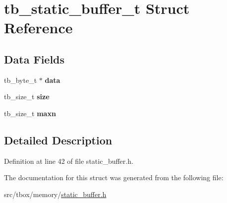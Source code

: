 \hypertarget{structtb__static__buffer__t}{\section{tb\-\_\-static\-\_\-buffer\-\_\-t Struct Reference}
\label{structtb__static__buffer__t}
}
\subsection*{Data Fields}
\begin{DoxyCompactItemize}
\item 
\hypertarget{structtb__static__buffer__t_a0491d754723b9ba346cbd25fd88e7c6f}{tb\-\_\-byte\-\_\-t $\ast$ {\bfseries data}}\label{structtb__static__buffer__t_a0491d754723b9ba346cbd25fd88e7c6f}

\item 
\hypertarget{structtb__static__buffer__t_afc6510d45901f179095ff1e505e4b572}{tb\-\_\-size\-\_\-t {\bfseries size}}\label{structtb__static__buffer__t_afc6510d45901f179095ff1e505e4b572}

\item 
\hypertarget{structtb__static__buffer__t_abe7d1faa52fd5d7d526fd423285da879}{tb\-\_\-size\-\_\-t {\bfseries maxn}}\label{structtb__static__buffer__t_abe7d1faa52fd5d7d526fd423285da879}

\end{DoxyCompactItemize}


\subsection{Detailed Description}


Definition at line 42 of file static\-\_\-buffer.\-h.



The documentation for this struct was generated from the following file\-:\begin{DoxyCompactItemize}
\item 
src/tbox/memory/\hyperlink{static__buffer_8h}{static\-\_\-buffer.\-h}\end{DoxyCompactItemize}

